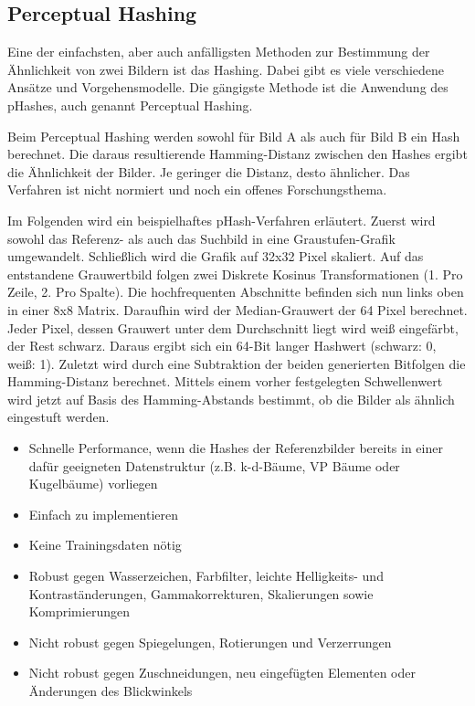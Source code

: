 \subsection{Perceptual Hashing}
Eine der einfachsten, aber auch anfälligsten Methoden zur Bestimmung der
Ähnlichkeit von zwei Bildern ist das Hashing. Dabei gibt es viele verschiedene
Ansätze und Vorgehensmodelle. Die gängigste Methode ist die Anwendung des
pHashes, auch genannt Perceptual Hashing. \parencite{hashing-apiumhub}

Beim Perceptual Hashing werden sowohl für Bild A als auch für Bild B ein Hash
berechnet. Die daraus resultierende Hamming-Distanz zwischen den Hashes ergibt
die Ähnlichkeit der Bilder. Je geringer die Distanz, desto ähnlicher. Das
Verfahren ist nicht normiert und noch ein offenes
Forschungsthema. \parencite{hashing-phash}

Im Folgenden wird ein beispielhaftes pHash-Verfahren erläutert. Zuerst wird
sowohl das Referenz- als auch das Suchbild in eine Graustufen-Grafik
umgewandelt. Schließlich wird die Grafik auf 32x32 Pixel skaliert. Auf das
entstandene Grauwertbild folgen zwei Diskrete Kosinus Transformationen (1. Pro
Zeile, 2. Pro Spalte). Die hochfrequenten Abschnitte befinden sich nun links
oben in einer 8x8 Matrix. Daraufhin wird der Median-Grauwert der 64 Pixel
berechnet. Jeder Pixel, dessen Grauwert unter dem Durchschnitt liegt wird weiß
eingefärbt, der Rest schwarz. Daraus ergibt sich ein 64-Bit langer Hashwert
(schwarz: 0, weiß: 1). Zuletzt wird durch eine Subtraktion der beiden
generierten Bitfolgen die Hamming-Distanz berechnet. Mittels einem vorher
festgelegten Schwellenwert wird jetzt auf Basis des Hamming-Abstands bestimmt,
ob die Bilder als ähnlich eingestuft werden. \parencite{hashing-apiumhub}

\begin{itemize}[topsep=0pt]
    \item Schnelle Performance, wenn die Hashes der Referenzbilder bereits in
    einer dafür geeigneten Datenstruktur (z.B. k-d-Bäume, VP Bäume oder
    Kugelbäume) vorliegen \parencite{hashing-lvngd}
    \item Einfach zu implementieren
    \item Keine Trainingsdaten nötig
    \item Robust gegen Wasserzeichen, Farbfilter, leichte Helligkeits- und
    Kontraständerungen, Gammakorrekturen, Skalierungen sowie Komprimierungen
    \parencite{hashing-phash}
\end{itemize}

\begin{itemize}[topsep=0pt]
    \item Nicht robust gegen Spiegelungen, Rotierungen und Verzerrungen
    \item Nicht robust gegen Zuschneidungen, neu eingefügten Elementen oder
    Änderungen des Blickwinkels
\end{itemize}